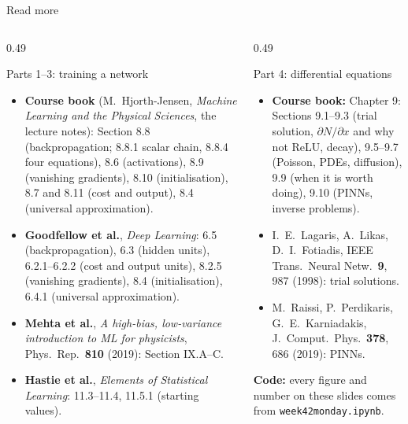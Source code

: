 \documentclass[10pt,aspectratio=169]{beamer}
\begin{document}
\begin{frame}{Read more}
\footnotesize
\begin{columns}[T]
\begin{column}{0.49\textwidth}
\begin{block}{Parts 1--3: training a network}
\footnotesize
\begin{itemize}
  \item \textbf{Course book} (M.~Hjorth-Jensen, \emph{Machine Learning
        and the Physical Sciences}, the lecture notes): Section 8.8
        (backpropagation; 8.8.1 scalar chain, 8.8.4 four equations),
        8.6 (activations), 8.9 (vanishing gradients), 8.10
        (initialisation), 8.7 and 8.11 (cost and output), 8.4 (universal
        approximation).
  \item \textbf{Goodfellow et al.}, \emph{Deep Learning}: 6.5
        (backpropagation), 6.3 (hidden units), 6.2.1--6.2.2 (cost and
        output units), 8.2.5 (vanishing gradients), 8.4 (initialisation),
        6.4.1 (universal approximation).
  \item \textbf{Mehta et al.}, \emph{A high-bias, low-variance
        introduction to ML for physicists}, Phys.\ Rep.\ \textbf{810}
        (2019): Section IX.A--C.
  \item \textbf{Hastie et al.}, \emph{Elements of Statistical Learning}:
        11.3--11.4, 11.5.1 (starting values).
\end{itemize}
\end{block}
\end{column}
\begin{column}{0.49\textwidth}
\begin{block}{Part 4: differential equations}
\footnotesize
\begin{itemize}
  \item \textbf{Course book:} Chapter 9: Sections 9.1--9.3 (trial
        solution, $\partial N/\partial x$ and why not ReLU, decay),
        9.5--9.7 (Poisson, PDEs, diffusion), 9.9 (when it is worth
        doing), 9.10 (PINNs, inverse problems).
  \item I.~E.~Lagaris, A.~Likas, D.~I.~Fotiadis, IEEE Trans.\ Neural
        Netw.\ \textbf{9}, 987 (1998): trial solutions.
  \item M.~Raissi, P.~Perdikaris, G.~E.~Karniadakis, J.\ Comput.\ Phys.\
        \textbf{378}, 686 (2019): PINNs.
\end{itemize}
\end{block}
\textbf{Code:} every figure and number on these slides comes from
\texttt{week42monday.ipynb}.
\end{column}
\end{columns}
\end{frame}
\end{document}
